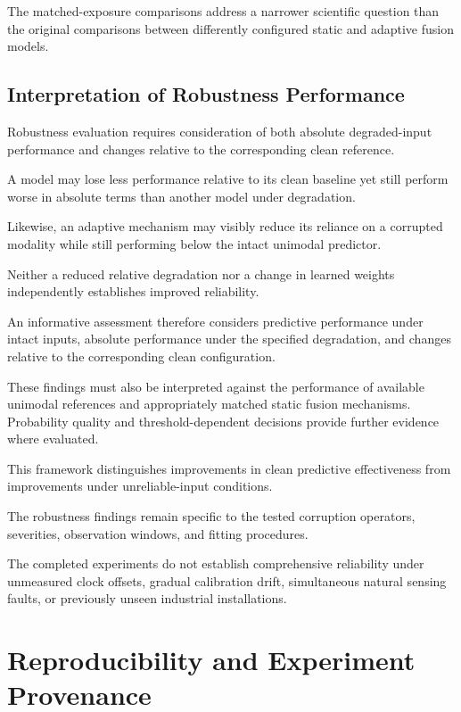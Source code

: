 The matched-exposure comparisons address a narrower scientific question than the original comparisons between differently configured static and adaptive fusion models.

\subsection{Interpretation of Robustness Performance}

Robustness evaluation requires consideration of both absolute degraded-input performance and changes relative to the corresponding clean reference.

A model may lose less performance relative to its clean baseline yet still perform worse in absolute terms than another model under degradation.

Likewise, an adaptive mechanism may visibly reduce its reliance on a corrupted modality while still performing below the intact unimodal predictor.

Neither a reduced relative degradation nor a change in learned weights independently establishes improved reliability.

An informative assessment therefore considers predictive performance under intact inputs, absolute performance under the specified degradation, and changes relative to the corresponding clean configuration.

These findings must also be interpreted against the performance of available unimodal references and appropriately matched static fusion mechanisms. Probability quality and threshold-dependent decisions provide further evidence where evaluated.

This framework distinguishes improvements in clean predictive effectiveness from improvements under unreliable-input conditions.

The robustness findings remain specific to the tested corruption operators, severities, observation windows, and fitting procedures.

The completed experiments do not establish comprehensive reliability under unmeasured clock offsets, gradual calibration drift, simultaneous natural sensing faults, or previously unseen industrial installations.

\section{Reproducibility and Experiment Provenance}
\label{sec:ch4-reproducibility}

